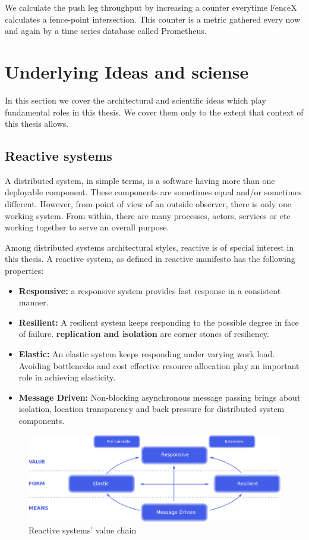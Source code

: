\documentclass[a4]{report}
\begin{document}
    We calculate the push leg throughput by increasing a counter everytime FenceX calculates a fence-point intersection.
    This counter is a metric gathered every now and again by a time series database called Prometheus.


    \section{Underlying Ideas and sciense}
    In this section we cover the architectural and scientific ideas which play fundamental roles in this thesis.
    We cover them only to the extent that context of this thesis allows.

    \subsection{Reactive systems}
    A distributed system, in simple terms, is a software having more than one deployable component.
    These components are sometimes equal and/or sometimes different.
    However, from point of view of an outside observer, there is only one working system.
    From within, there are many processes, actors, services or etc working together to serve an overall purpose.

    Among distributed systems architectural styles, reactive is of special interest in this thesis.
    A reactive system, as defined in reactive manifesto \cite{reactive-manifesto} has the following properties:
    \begin{itemize}
        \item \textbf{Responsive:} a responsive system provides fast response in a consistent manner.
        \item \textbf{Resilient:} A resilient system keeps responding to the possible degree in face of failure.
        \textbf{replication and isolation} are corner stones of resiliency.
        \item \textbf{Elastic:} An elastic system keeps responding under varying work load. Avoiding bottlenecks and cost
        effective resource allocation play an important role in achieving elasticity.
        \item \textbf{Message Driven:} Non-blocking asynchronous message passing brings about isolation, location
        transparency and back pressure for distributed system components.
    \end{itemize}

    \begin{figure}[ht]
        \caption{Reactive systems' value chain \cite{reactive-manifesto}}
        \label{fig:reactive-value}
        \includegraphics[scale=0.4]{images/reactive-traits.png}
    \end{figure}
\end{document}
